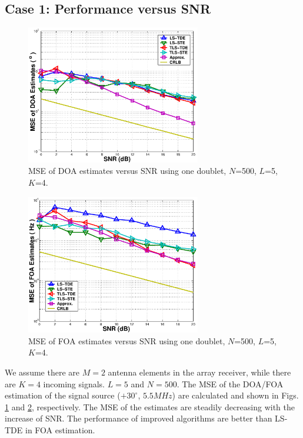 \documentclass[a4paper,10pt,fleqn,twocolumn]{IEEEtran}
\begin{document}
\subsection*{Case 1: Performance versus SNR}
\begin{figure}
\begin{center}
\includegraphics[width=3in]{SF_DOASNR.eps}
\caption{MSE of DOA estimates versus SNR using one doublet,
$N$=500, $L$=5, $K$=4.} \label{SF_DOASNR}
\end{center}
\end{figure}
\begin{figure}
\begin{center}
\includegraphics[width=3in]{SF_FOASNR.eps}
\caption{MSE of FOA estimates versus SNR using one doublet,
$N$=500, $L$=5, $K$=4.} \label{SF_FOASNR}
\end{center}
\end{figure}

We assume there are $M=2$ antenna elements in the array receiver,
while there are $K=4$ incoming signals. $L=5$ and $N=500$. The MSE
of the DOA/FOA estimation of the signal source ($+30^{\circ}$,
$5.5MHz$) are calculated and shown in Figs. \ref{SF_DOASNR} and
\ref{SF_FOASNR}, respectively. The MSE of the estimates are
steadily decreasing with the increase of SNR. The performance of
improved algorithms are better than LS-TDE in FOA estimation.
\end{document}

